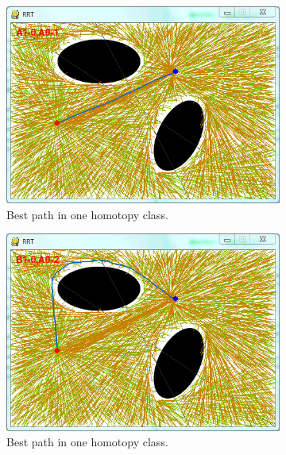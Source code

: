 \documentclass[letterpaper, 10 pt, conference]{ieeeconf}
\begin{document}
\begin{figure}
	\centering
	\begin{subfigure}[t]{0.47\linewidth}
		\centering
		\includegraphics[width=\textwidth]{fig/all_homotopy1.png}
		\caption{Best path in one homotopy class.}
		\label{fig:all_homotopy:01}
	\end{subfigure}  
	\begin{subfigure}[t]{0.47\linewidth}
		\centering
		\includegraphics[width=\textwidth]{fig/all_homotopy2.png}
		\caption{Best path in one homotopy class.}
		\label{fig:all_homotopy:02}
	\end{subfigure}
	\\
	\begin{subfigure}[t]{0.47\linewidth}

\end{subfigure}
\end{figure}
\end{document}
